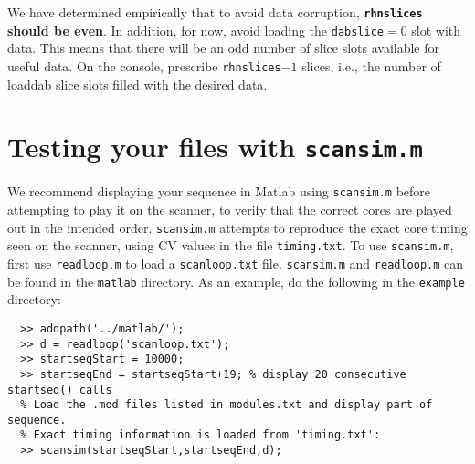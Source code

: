 We have determined empirically that to avoid data corruption, {\bf{\tt rhnslices} should be even}.
In addition, for now, avoid loading the {\tt dabslice}$=0$ slot with data. 
This means that there will be an odd number of slice slots available for useful data.
On the console, prescribe {\tt rhnslices}$-1$ slices, i.e., the number of loaddab slice slots filled with the desired data.

\section{Testing your files with {\tt scansim.m} }

We recommend displaying your sequence in Matlab using \texttt{scansim.m} before attempting to play it on the scanner, to verify that the correct cores are played out in the intended order.
\texttt{scansim.m} attempts to reproduce the exact core timing seen on the scanner, using CV values in the file \texttt{timing.txt}.
To use \texttt{scansim.m}, first use \texttt{readloop.m} to load a \texttt{scanloop.txt} file.
\texttt{scansim.m} and \texttt{readloop.m} can be found in the \texttt{matlab} directory.
As an example, do the following in the \texttt{example} directory:
\begin{lstlisting}
  >> addpath('../matlab/');
  >> d = readloop('scanloop.txt');
  >> startseqStart = 10000;
  >> startseqEnd = startseqStart+19; % display 20 consecutive startseq() calls
  % Load the .mod files listed in modules.txt and display part of sequence.
  % Exact timing information is loaded from 'timing.txt':
  >> scansim(startseqStart,startseqEnd,d);  
\end{lstlisting}





